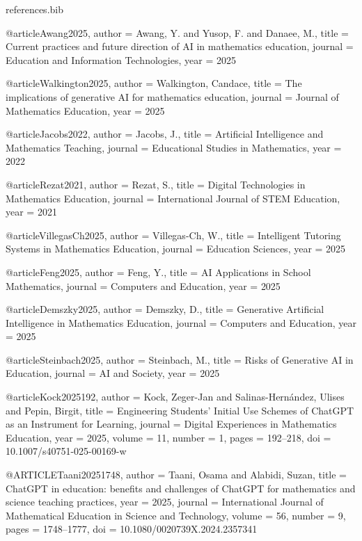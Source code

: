 \begin{filecontents}{references.bib}

@article{Awang2025,
  author = {Awang, Y. and Yusop, F. and Danaee, M.},
  title = {Current practices and future direction of AI in mathematics education},
  journal = {Education and Information Technologies},
  year = {2025}
}

@article{Walkington2025,
  author = {Walkington, Candace},
  title = {The implications of generative AI for mathematics education},
  journal = {Journal of Mathematics Education},
  year = {2025}
}

@article{Jacobs2022,
  author = {Jacobs, J.},
  title = {Artificial Intelligence and Mathematics Teaching},
  journal = {Educational Studies in Mathematics},
  year = {2022}
}

@article{Rezat2021,
  author = {Rezat, S.},
  title = {Digital Technologies in Mathematics Education},
  journal = {International Journal of STEM Education},
  year = {2021}
}

@article{VillegasCh2025,
  author = {Villegas-Ch, W.},
  title = {Intelligent Tutoring Systems in Mathematics Education},
  journal = {Education Sciences},
  year = {2025}
}

@article{Feng2025,
  author = {Feng, Y.},
  title = {AI Applications in School Mathematics},
  journal = {Computers and Education},
  year = {2025}
}

@article{Demszky2025,
  author = {Demszky, D.},
  title = {Generative Artificial Intelligence in Mathematics Education},
  journal = {Computers and Education},
  year = {2025}
}

@article{Steinbach2025,
  author = {Steinbach, M.},
  title = {Risks of Generative AI in Education},
  journal = {AI and Society},
  year = {2025}
}

@article{Kock2025192,
  author  = {Kock, Zeger-Jan and Salinas-Hernández, Ulises and Pepin, Birgit},
  title   = {Engineering Students’ Initial Use Schemes of ChatGPT as an Instrument for Learning},
  journal = {Digital Experiences in Mathematics Education},
  year    = {2025},
  volume   = {11},
  number   = {1},
  pages    = {192--218},
  doi      = {10.1007/s40751-025-00169-w}
}

@ARTICLE{Taani20251748,
 author = {Taani, Osama and Alabidi, Suzan},
 title = {ChatGPT in education: benefits and challenges of ChatGPT for mathematics and science teaching practices},
 year = {2025},
 journal = {International Journal of Mathematical Education in Science and Technology},
 volume = {56},
 number = {9},
 pages = {1748--1777},
 doi = {10.1080/0020739X.2024.2357341}
}


\end{filecontents}
